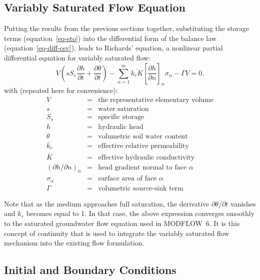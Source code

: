 \documentclass[fleqn]{article}
\begin{document}
\subsection{Variably Saturated Flow Equation}
Putting the results from the previous sections together,
substituting the storage terms (equation~\ref{eq-sto}) into the 
differential form of the balance law (equation~\ref{eq-diff-csv}), 
leads to Richards' equation, a nonlinear partial differential equation for 
variably saturated flow:
\begin{equation}  
  V
  \left(
    s S_s \frac{\partial h}{\partial t} + 
    \frac{\partial \theta}{\partial t}
  \right) -
  \sum_{\alpha=1}^{m} \overline{k_r K}
  \left[\frac{\partial h}{\partial n}\right]_\alpha \sigma_\alpha -
  \Gamma V = 0.
  \label{eq-unsat-flow}
\end{equation}
with (repeated here for convenience):
\begin{eqnarray*}
  V &=& \text{the representative elementary volume} \\
  s &=& \text{water saturation} \\
  S_s &=& \text{specific storage} \\
  h &=& \text{hydraulic head} \\
  \theta &=& \text{volumetric soil water content} \\
  \overline{k_r} &=& \text{effective relative permeability} \\
  \overline{K} &=& \text{effective hydraulic conductivity} \\
  (\partial h/\partial n)_\alpha &=& \text{head gradient normal to face $\alpha$} \\
  \sigma_\alpha &=& \text{surface area of face $\alpha$} \\
  \Gamma &=& \text{volumetric source-sink term}
\end{eqnarray*}

Note that as the medium approaches full saturation, the derivative
$\partial \theta/ \partial t$ vanishes and $k_r$ becomes equal to 1.
In that case, the above expression converges smoothly to the saturated
groundwater flow equation used in MODFLOW~6. It is this concept of
continuity that is used to integrate the variably saturated flow 
mechanism into the existing flow formulation.


\subsection{Initial and Boundary Conditions}\label{sec-boundary-conditions}
\end{document}
